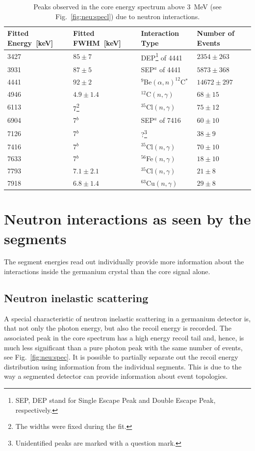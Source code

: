 \begin{table}[tbhp]
\centering
\caption{Peaks observed in the core energy spectrum above 3~MeV
(see Fig.~\ref{fig:neu:specl}) due to neutron interactions.} 
\label{tab:neu:peak2}
\begin{minipage}{\linewidth}\centering
\begin{tabular*}{\textwidth}{llll} \hline\noalign{\smallskip}
Fitted Energy~[keV]& Fitted FWHM~[keV]& Interaction Type& Number of Events\\\hline
3427 & $85 \pm 7$ & DEP\footnote{SEP, DEP stand for Single Escape Peak and Double Escape Peak, respectively.} of 4441 & $2354 \pm 263$ \\
3931 & $87 \pm 5$  & SEP$^a$ of 4441 & $5873 \pm 368$ \\
4441 & $92 \pm 2$  & $^{9}$Be$(\alpha,n)^{12}$C$^{*}$ & $14672 \pm 297$ \\
4946 & $4.9\pm1.4$ & $^{12}$C$(n,\gamma)$            & $68 \pm 15$     \\
6113 & 7\footnote{The widths were fixed during the fit.} & $^{35}$Cl$(n,\gamma)$ & $75 \pm 12$ \\
6904 & 7$^b$      & SEP$^a$ of 7416            & $60 \pm 10$ \\
7126 & 7$^b$ & ?\footnote{Unidentified peaks are marked with a question mark.} & $38 \pm  9$ \\
7416 & 7$^b$       & $^{35}$Cl$(n,\gamma)$ & $70 \pm 10$ \\
7633 & 7$^b$       & $^{56}$Fe$(n,\gamma)$ & $18 \pm 10$ \\
7793 & $7.1\pm2.1$ & $^{35}$Cl$(n,\gamma)$ & $21 \pm  8$ \\
7918 & $6.8\pm1.4$ & $^{63}$Cu$(n,\gamma)$ & $29 \pm  8$ \\
\end{tabular*}
\end{minipage}
\end{table}

\section{Neutron interactions as seen by the segments}
\label{sec:neu:seg}
The segment energies read out individually provide more information
about the interactions inside the germanium crystal than the core
signal alone.

\subsection{Neutron inelastic scattering}
A special characteristic of neutron inelastic scattering in a
germanium detector is, that not only the photon energy, but also the
recoil energy is recorded. The associated peak in the core spectrum
has a high energy recoil tail and, hence, is much less significant
than a pure photon peak with the same number of events, see
Fig.~\ref{fig:neu:spec}. It is possible to partially separate out the
recoil energy distribution using information from the individual
segments. This is due to the way a segmented detector can provide
information about event topologies.


